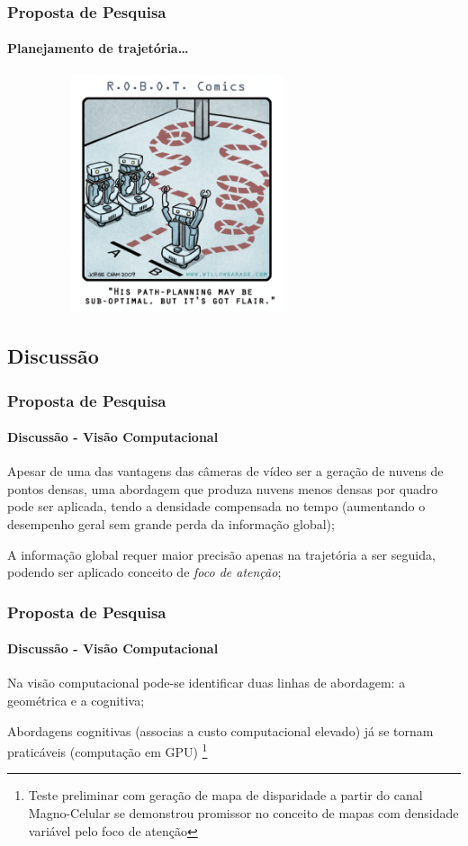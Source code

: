 \documentclass[brazil]{beamer}
\begin{document}
\begin{frame}
\frametitle{Proposta de Pesquisa}
\framesubtitle{Planejamento de trajetória\ldots}
\includegraphics[width=10cm,height=7cm,]{nav_comic.png}
\end{frame}


\subsection[Discussão]{Discussão}


\begin{frame}
\frametitle{Proposta de Pesquisa}
\framesubtitle{Discussão - Visão Computacional}
\begin{block}{}
Apesar de uma das vantagens das câmeras de vídeo ser a geração de nuvens de pontos densas, 
uma abordagem que produza nuvens menos densas por quadro pode ser aplicada, tendo a densidade 
compensada no tempo (aumentando o desempenho geral sem grande perda da informação global);
\end{block}
\begin{block}{}
A informação global requer maior precisão apenas na trajetória a ser seguida, 
podendo ser aplicado conceito de \textit{foco de atenção};
\end{block}
\end{frame}

\begin{frame}
\frametitle{Proposta de Pesquisa}
\framesubtitle{Discussão - Visão Computacional}
\begin{block}{}
Na visão computacional pode-se identificar duas linhas de abordagem: 
a geométrica e a cognitiva;
\end{block}
\begin{block}{}
Abordagens cognitivas (associas a custo computacional elevado) já se tornam
praticáveis (computação em GPU) 
\footnote{Teste preliminar com geração de mapa de disparidade a partir do canal 
Magno-Celular se demonstrou promissor no conceito de mapas com densidade variável 
pelo foco de atenção} 
\end{block}
\end{frame}
\end{document}
